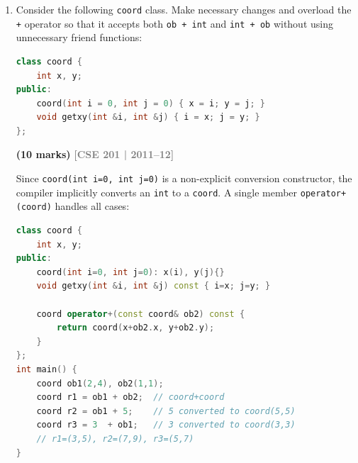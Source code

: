 \documentclass[12pt,a3paper]{article}
\newcommand{\yr}[1]{\hfill\textcolor{gray}{\small\textbf{[#1]}}}
\newcommand{\mk}[1]{\textcolor{orange!70!black}{\small\textbf{(#1 marks)}}}
\begin{document}
\begin{enumerate}
\begin{tcolorbox}[enhanced,breakable,ansbox,colback=cF!4,colframe=cF,
  boxrule=0.8pt,arc=5pt,
  title={\textbf{Answer --- coord class full overloading}},
  fonttitle=\bfseries\color{white},colbacktitle=cF]
\begin{lstlisting}[language=C++]
class coord {
    int x, y;
public:
    coord(int i=0, int j=0): x(i), y(j){}
    void getxy(int &i, int &j) const { i=x; j=y; }

    // (a) ob + int
    coord operator+(int i) const { return coord(x+i, y+i); }

    // (b) int + ob  (friend)
    friend coord operator+(int i, const coord& ob) {
        return coord(ob.x+i, ob.y+i);
    }

    // (c) inserter
    friend ostream& operator<<(ostream& os, const coord& c) {
        os<<"("<<c.x<<","<<c.y<<")"; return os;
    }
    // (c) extractor
    friend istream& operator>>(istream& is, coord& c) {
        is>>c.x>>c.y; return is;
    }
};

int main() {
    coord ob1(2,4);
    cout << ob1+5  << "\n";   // (7,9)
    cout << 100+ob1<< "\n";   // (102,104)
    cout << ob1    << "\n";   // (2,4)
}
\end{lstlisting}

\end{tcolorbox}


\item Consider the following \texttt{coord} class. Make necessary changes and overload the \texttt{+} operator so that it accepts both \texttt{ob + int} and \texttt{int + ob} without using unnecessary friend functions:
\begin{lstlisting}[language=C++]
class coord {
    int x, y;
public:
    coord(int i = 0, int j = 0) { x = i; y = j; }
    void getxy(int &i, int &j) { i = x; j = y; }
};
\end{lstlisting}
\mk{10}
\yr{CSE 201 | 2011--12}

\begin{tcolorbox}[enhanced,breakable,ansbox,colback=cF!4,colframe=cF,
  boxrule=0.8pt,arc=5pt,
  title={\textbf{Answer --- coord ob+int and int+ob without unnecessary friend}},
  fonttitle=\bfseries\color{white},colbacktitle=cF]

Since \texttt{coord(int i=0, int j=0)} is a non-explicit conversion
constructor, the compiler implicitly converts an \texttt{int} to a
\texttt{coord}.  A single member \texttt{operator+(coord)} handles
all cases:

\begin{lstlisting}[language=C++]
class coord {
    int x, y;
public:
    coord(int i=0, int j=0): x(i), y(j){}
    void getxy(int &i, int &j) const { i=x; j=y; }

    coord operator+(const coord& ob2) const {
        return coord(x+ob2.x, y+ob2.y);
    }
};
int main() {
    coord ob1(2,4), ob2(1,1);
    coord r1 = ob1 + ob2;  // coord+coord
    coord r2 = ob1 + 5;    // 5 converted to coord(5,5)
    coord r3 = 3  + ob1;   // 3 converted to coord(3,3)
    // r1=(3,5), r2=(7,9), r3=(5,7)
}
\end{lstlisting}


\end{tcolorbox}
\end{enumerate}
\end{document}
